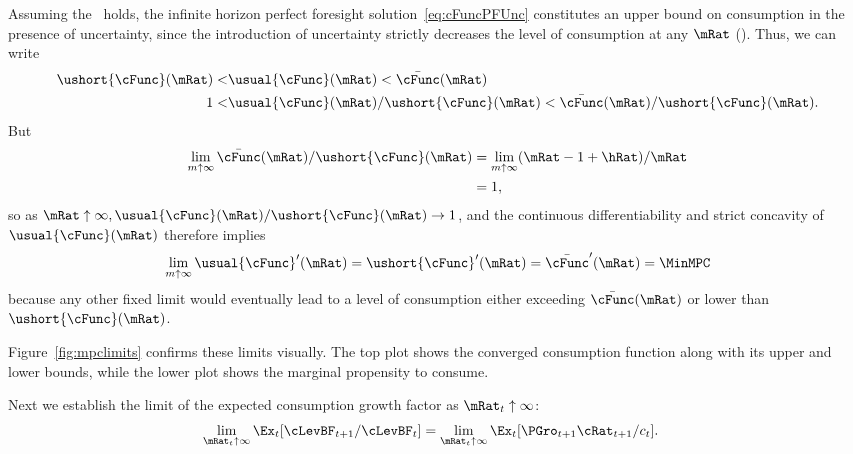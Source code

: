 \documentclass[BufferStockTheory]{subfiles}
\begin{document}
Assuming the \FHWC~holds, the infinite horizon perfect foresight solution~\eqref{eq:cFuncPFUnc} constitutes an upper bound on consumption in the presence of uncertainty, since the introduction of uncertainty strictly decreases the level of consumption at any $\mRat$ (\cite{ckConcavity}).  Thus, we can write
\begin{align}
  \ushort{\cFunc}(\mRat) < & \usual{\cFunc}(\mRat)  < \bar{\cFunc}(\mRat) \label{eq:lowerltupper} \\
  1 < & \usual{\cFunc}(\mRat)/\ushort{\cFunc}(\mRat)  < \bar{\cFunc}(\mRat)/\ushort{\cFunc}(\mRat). \nonumber
\end{align}
But
\begin{align*}  \label{eq:limitlowerupper}
  \lim_{m \uparrow \infty} \bar{\cFunc}(\mRat)/\ushort{\cFunc}(\mRat)
  & = \lim_{m \uparrow \infty} (\mRat -1+ \hRat)/\mRat  \\
  & = 1,
\end{align*}
so as $\mRat \uparrow \infty, \usual{\cFunc}(\mRat)/\ushort{\cFunc}(\mRat)
\rightarrow 1$, and the continuous differentiability and strict
concavity of $\usual{\cFunc}(\mRat)$ therefore implies
\begin{equation*}  \label{eq:limxtoinftycp}
  \lim_{m \uparrow \infty} \usual{\cFunc}^{\prime}(\mRat) =
  \ushort{\cFunc}^{\prime}(\mRat) = \bar{\cFunc}^{\prime}(\mRat) = \MinMPC
\end{equation*}
because any other fixed limit would eventually lead to a level of
consumption either exceeding $\bar{\cFunc}(\mRat)$ or lower than
$\ushort{\cFunc}(\mRat)$.

Figure~\ref{fig:mpclimits} confirms these limits visually.  The top
plot shows the converged consumption function along with its upper and lower bounds,
while the lower plot shows the marginal propensity to consume.

\renewcommand{\figFile}{mpclimits}
\hypertarget{\figFile}{}


\renewcommand{\figFile}{cFuncBounds}
\hypertarget{\figFile}{}


Next we establish the limit of the expected consumption growth factor
as $\mRat_{t} \uparrow \infty$:
\begin{align*}
  \lim_{\mRat_{t} \uparrow \infty} \Ex_{t}[
  \cLevBF_{t+1}/\cLevBF_{t}]  & = \lim_{\mRat_{t} \uparrow \infty} \Ex_{t}[
                                {\PGro}_{t+1} {\cRat}_{t+1}/c_{t}].
\end{align*}
\end{document}

